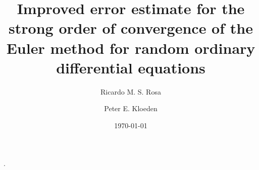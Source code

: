 \documentclass[reqno,12pt]{amsart}
\theoremstyle{plain}%
\theoremstyle{definition}
\begin{document}


\title[Strong order convergence of Euler for Random ODEs]{Improved error estimate for the strong order of convergence of the Euler method for random ordinary differential equations}

\author[R. M. S. Rosa]{Ricardo M. S. Rosa}
\author[P. E. Kloeden]{Peter E. Kloeden}

\address[Ricardo M. S. Rosa]{Instituto de Matem\'atica, Universidade Federal do Rio de Janeiro, Brazil}
\address[Peter E. Kloeden]{Mathematics Department, University of Tubingen, Germany}


\date{\today}


.
\end{document}
